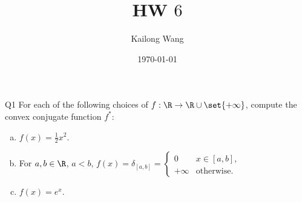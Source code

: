 \documentclass{article}
\title{HW $6$}
\author{Kailong Wang}
\date{\today}
\theoremstyle{plain}
\theoremstyle{definition}
\theoremstyle{remark}
\begin{document}
\maketitle

\begin{problem}
    {Q1}
    For each of the following choices of $f:\R\rightarrow \R \cup \set{+\infty}$, compute the convex conjugate function $f^*$:
    \begin{enumerate}[(a)]
        \item $f(x)=\frac{1}{2}x^2$.
        \item For $a ,b\in\R$, $a<b$, ${
            f(x)=\delta_{[a, b]}= \begin{cases}
                0 & x\in [a, b],\\
                +\infty & \text{otherwise}.
            \end{cases}
            }$
        \item $f(x)=e^x$.
    \end{enumerate}
\end{problem}
\end{document}
